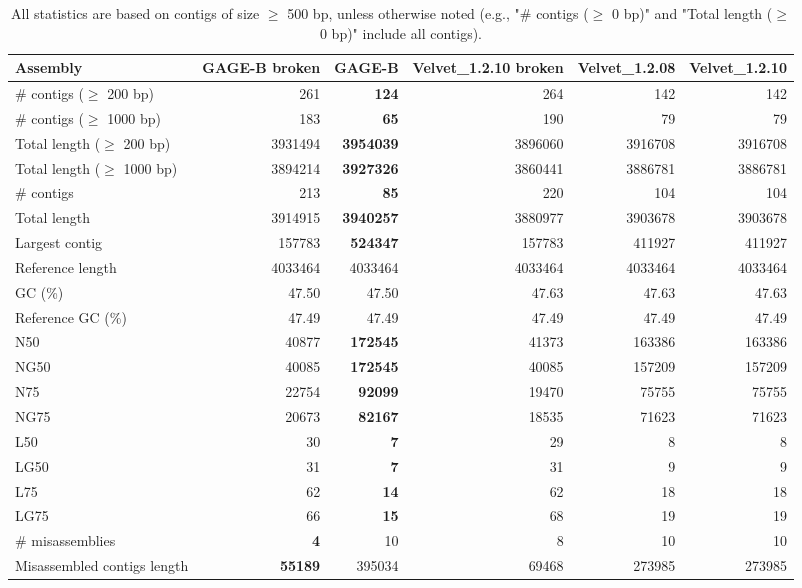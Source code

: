 \documentclass[12pt,a4paper]{article}
\begin{document}
\begin{table}[ht]
\begin{center}
\caption{All statistics are based on contigs of size $\geq$ 500 bp, unless otherwise noted (e.g., "\# contigs ($\geq$ 0 bp)" and "Total length ($\geq$ 0 bp)" include all contigs).}
\begin{tabular}{|l*{5}{|r}|}
\hline
Assembly & GAGE-B broken & GAGE-B & Velvet\_1.2.10 broken & Velvet\_1.2.08 & Velvet\_1.2.10 \\ \hline
\# contigs ($\geq$ 200 bp) & 261 & {\bf 124} & 264 & 142 & 142 \\ \hline
\# contigs ($\geq$ 1000 bp) & 183 & {\bf 65} & 190 & 79 & 79 \\ \hline
Total length ($\geq$ 200 bp) & 3931494 & {\bf 3954039} & 3896060 & 3916708 & 3916708 \\ \hline
Total length ($\geq$ 1000 bp) & 3894214 & {\bf 3927326} & 3860441 & 3886781 & 3886781 \\ \hline
\# contigs & 213 & {\bf 85} & 220 & 104 & 104 \\ \hline
Total length & 3914915 & {\bf 3940257} & 3880977 & 3903678 & 3903678 \\ \hline
Largest contig & 157783 & {\bf 524347} & 157783 & 411927 & 411927 \\ \hline
Reference length & 4033464 & 4033464 & 4033464 & 4033464 & 4033464 \\ \hline
GC (\%) & 47.50 & 47.50 & 47.63 & 47.63 & 47.63 \\ \hline
Reference GC (\%) & 47.49 & 47.49 & 47.49 & 47.49 & 47.49 \\ \hline
N50 & 40877 & {\bf 172545} & 41373 & 163386 & 163386 \\ \hline
NG50 & 40085 & {\bf 172545} & 40085 & 157209 & 157209 \\ \hline
N75 & 22754 & {\bf 92099} & 19470 & 75755 & 75755 \\ \hline
NG75 & 20673 & {\bf 82167} & 18535 & 71623 & 71623 \\ \hline
L50 & 30 & {\bf 7} & 29 & 8 & 8 \\ \hline
LG50 & 31 & {\bf 7} & 31 & 9 & 9 \\ \hline
L75 & 62 & {\bf 14} & 62 & 18 & 18 \\ \hline
LG75 & 66 & {\bf 15} & 68 & 19 & 19 \\ \hline
\# misassemblies & {\bf 4} & 10 & 8 & 10 & 10 \\ \hline
Misassembled contigs length & {\bf 55189} & 395034 & 69468 & 273985 & 273985 \\ \hline

\end{tabular}
\end{center}
\end{table}
\end{document}
